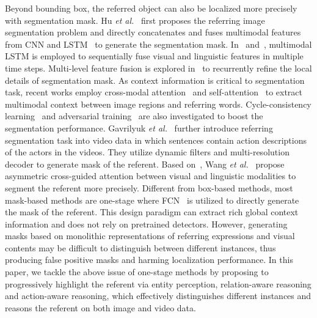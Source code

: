 \documentclass[10pt,journal,cspaper,compsoc]{IEEEtran}
\begin{document}
Beyond bounding box, the referred object can also be localized more precisely with segmentation mask. 
Hu \textit{et al.}~\cite{hu2016segmentation} first proposes the referring image segmentation problem and directly concatenates and fuses multimodal features from CNN and 
LSTM~\cite{hochreiter1997long} to generate the segmentation mask. 
In~\cite{liu2017recurrent} and~\cite{margffoy2018dynamic}, multimodal LSTM is employed to 
sequentially fuse visual and linguistic features in multiple time steps. 
Multi-level feature fusion is explored in~\cite{li2018referring} to recurrently refine the local details of segmentation mask. 
As context information is critical to segmentation task, recent works employ cross-modal attention~\cite{shi2018key}\cite{chen2019see}\cite{Ye2020DualCL} and self-attention~\cite{ye2019cross} to extract multimodal context between image regions and referring words. 
Cycle-consistency learning~\cite{chen2019referring} and adversarial training~\cite{qiu2019referring} are also investigated to boost the segmentation performance. 
Gavrilyuk \textit{et al.}~\cite{gavrilyuk2018actor} further introduce referring segmentation task into video data in which sentences contain action descriptions of the actors in the videos. 
They utilize dynamic filters and multi-resolution decoder to generate mask of the referent. 
Based on~\cite{gavrilyuk2018actor}, Wang \textit{et al.}~\cite{wang2019asymmetric} propose asymmetric cross-guided attention between visual and linguistic modalities to segment the referent more precisely. 
Different from box-based methods, most mask-based methods are one-stage where FCN~\cite{long2015fully} is utilized to directly generate the mask of the referent. 
This design paradigm can extract rich global context information and does not rely on pretrained detectors. 
However, generating masks based on monolithic representations of referring expressions and visual contents may be difficult to distinguish between different instances, thus producing false positive masks and harming localization performance. 
In this paper, we tackle the above issue of one-stage methods by proposing to progressively highlight the referent via entity perception, relation-aware reasoning and action-aware reasoning, which effectively distinguishes different instances and reasons the referent on both image and video data.
\end{document}
